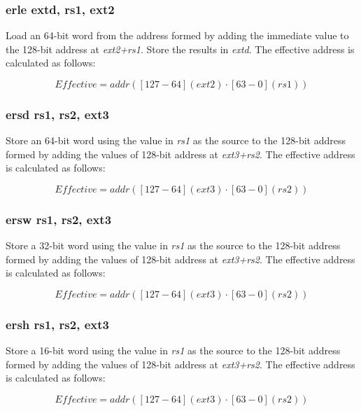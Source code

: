 \documentclass{article}
\begin{document}
\subsubsection{erle extd, rs1, ext2}

Load an 64-bit word from the address formed by adding the immediate value to the 
128-bit address at \textit{ext2+rs1}.  Store the results in \textit{extd}.  
The effective address is calculated as follows:

\begin{equation}
Effective = addr([127-64](ext2) \cdot [63-0](rs1))
\end{equation}

\subsubsection{ersd rs1, rs2, ext3}

Store an 64-bit word using the value in \textit{rs1} as the source 
to the 128-bit address formed by adding the values of
128-bit address at \textit{ext3+rs2}.  The effective address is calculated 
as follows: 

\begin{equation}
Effective = addr([127-64](ext3) \cdot [63-0](rs2))
\end{equation}

\subsubsection{ersw rs1, rs2, ext3}

Store a 32-bit word using the value in \textit{rs1} as the source 
to the 128-bit address formed by adding the values of
128-bit address at \textit{ext3+rs2}.  The effective address is calculated 
as follows: 

\begin{equation}
Effective = addr([127-64](ext3) \cdot [63-0](rs2))
\end{equation}

\subsubsection{ersh rs1, rs2, ext3}

Store a 16-bit word using the value in \textit{rs1} as the source 
to the 128-bit address formed by adding the values of
128-bit address at \textit{ext3+rs2}.  The effective address is calculated 
as follows: 

\begin{equation}
Effective = addr([127-64](ext3) \cdot [63-0](rs2))
\end{equation}
\end{document}
